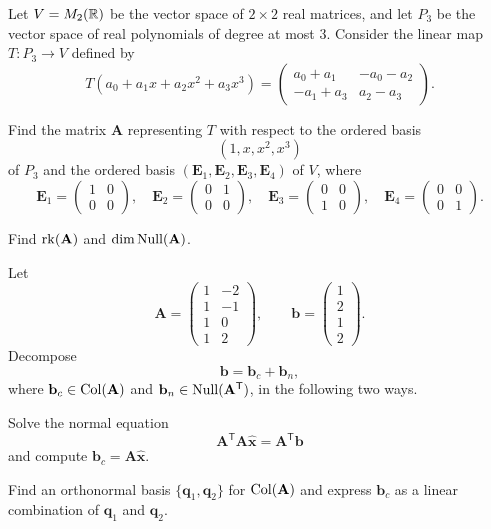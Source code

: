 \begin{problem}
Let $V=M_2(\mathbb{R})$ be the vector space of $2\times2$ real matrices, and let $P_3$ be the vector space of real polynomials of degree at most $3$. Consider the linear map $T\colon P_3\to V$ defined by
\[
T(a_0+a_1x+a_2x^2+a_3x^3)
=
\begin{pmatrix}
a_0+a_1&-a_0-a_2\\
-a_1+a_3&a_2-a_3
\end{pmatrix}.
\]
\begin{problemsubparts}
\item Find the matrix $\mathbf A$ representing $T$ with respect to the ordered basis
\[
(1,x,x^2,x^3)
\]
of $P_3$ and the ordered basis $(\mathbf E_1,\mathbf E_2,\mathbf E_3,\mathbf E_4)$ of $V$, where
\[
\mathbf E_1=
\begin{pmatrix}1&0\\0&0\end{pmatrix},\quad
\mathbf E_2=
\begin{pmatrix}0&1\\0&0\end{pmatrix},\quad
\mathbf E_3=
\begin{pmatrix}0&0\\1&0\end{pmatrix},\quad
\mathbf E_4=
\begin{pmatrix}0&0\\0&1\end{pmatrix}.
\]
\item Find $\operatorname{rk}(\mathbf A)$ and $\dim\operatorname{Null}(\mathbf A)$.
\end{problemsubparts}
\end{problem}

\begin{problem}
Let
\[
\mathbf A=
\begin{pmatrix}
1&-2\\
1&-1\\
1&0\\
1&2
\end{pmatrix},
\qquad
\mathbf b=
\begin{pmatrix}
1\\2\\1\\2
\end{pmatrix}.
\]
Decompose
\[
\mathbf b=\mathbf b_c+\mathbf b_n,
\]
where $\mathbf b_c\in\operatorname{Col}(\mathbf A)$ and $\mathbf b_n\in\operatorname{Null}(\mathbf A^{\mathsf T})$, in the following two ways.
\begin{problemsubparts}
\item Solve the normal equation
\[
\mathbf A^{\mathsf T}\mathbf A\widehat{\mathbf x}=\mathbf A^{\mathsf T}\mathbf b
\]
and compute $\mathbf b_c=\mathbf A\widehat{\mathbf x}$.
\item Find an orthonormal basis $\{\mathbf q_1,\mathbf q_2\}$ for $\operatorname{Col}(\mathbf A)$ and express $\mathbf b_c$ as a linear combination of $\mathbf q_1$ and $\mathbf q_2$.
\end{problemsubparts}
\end{problem}

